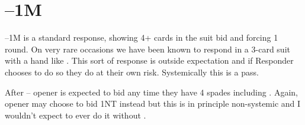 \documentclass[main]{subfiles}
\begin{document}
\section[1D--1M]{--1M}

--1M is a standard response, showing 4+ cards in the suit bid and forcing 1 round. On very rare occasions we have been known to respond in a 3-card suit with a hand like . This sort of response is outside expectation and if Responder chooses to do so they do at their own risk. Systemically this is a pass.

After -- opener is expected to bid  any time they have 4 spades including . Again, opener may choose to bid 1NT instead but this is in principle non-systemic and I wouldn't expect to ever do it without .  
\end{document}
